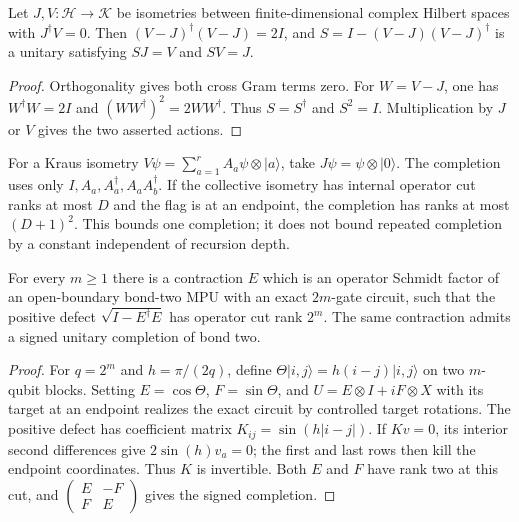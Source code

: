 \begin{lemma}
    \label{thm:mpu_orthogonal_isometry_swap}
    \leanok
    Let $J,V:\mathcal H\to\mathcal K$ be isometries between
    finite-dimensional complex Hilbert spaces with $J^\dagger V=0$.
    Then $(V-J)^\dagger(V-J)=2I$, and
    $S=I-(V-J)(V-J)^\dagger$ is a unitary satisfying $SJ=V$ and $SV=J$.
\end{lemma}
\begin{proof}\leanok
    Orthogonality gives both cross Gram terms zero. For $W=V-J$,
    one has $W^\dagger W=2I$ and $(WW^\dagger)^2=2WW^\dagger$.
    Thus $S=S^\dagger$ and $S^2=I$. Multiplication by $J$ or $V$
    gives the two asserted actions.
\end{proof}

For a Kraus isometry
$V\psi=\sum_{a=1}^r A_a\psi\otimes|a\rangle$, take
$J\psi=\psi\otimes|0\rangle$. The completion uses only
$I,A_a,A_a^\dagger,A_aA_b^\dagger$. If the collective isometry has
internal operator cut ranks at most $D$ and the flag is at an endpoint,
the completion has ranks at most $(D+1)^2$. This bounds one completion;
it does not bound repeated completion by a constant independent of
recursion depth.

\begin{lemma}
    \label{thm:mpu_positive_defect_rank_growth}
    For every $m\geq1$ there is a contraction $E$ which is an operator
    Schmidt factor of an open-boundary bond-two MPU with an exact
    $2m$-gate circuit, such that the positive defect
    $\sqrt{I-E^\dagger E}$ has operator cut rank $2^m$.
    The same contraction admits a signed unitary completion of bond two.
\end{lemma}
\begin{proof}
    For $q=2^m$ and $h=\pi/(2q)$, define
    $\Theta|i,j\rangle=h(i-j)|i,j\rangle$ on two $m$-qubit blocks.
    Setting $E=\cos\Theta$, $F=\sin\Theta$, and
    $U=E\otimes I+iF\otimes X$ with its target at an endpoint
    realizes the exact circuit by controlled target rotations.
    The positive defect has coefficient matrix
    $K_{ij}=\sin(h|i-j|)$. If $Kv=0$, its interior second differences
    give $2\sin(h)v_a=0$; the first and last rows then kill the
    endpoint coordinates. Thus $K$ is invertible.
    Both $E$ and $F$ have rank two at this cut, and
    $\left(\begin{smallmatrix}E&-F\\F&E\end{smallmatrix}\right)$
    gives the signed completion.
\end{proof}

